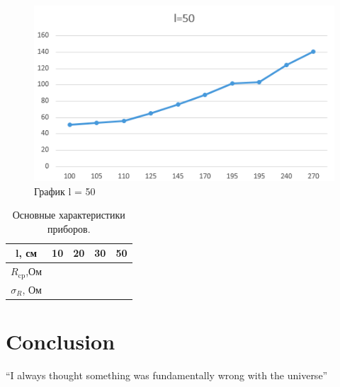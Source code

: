 \documentclass[14pt, a4paper]{scrartcl}
\begin{document}
\begin{figure}
\centering
\includegraphics[scale=1]{leq50.png}
\caption{График l = 50}
\label{fig:50len}
\end{figure}

\begin{table}[H]
\caption{\label{tab:charast}Основные характеристики приборов.}
\begin{center}
\begin{tabular}{|c|c|c|c|c|}
\hline
l, см& 10 & 20 & 30 & 50 \\
\hline
$R_\text{cp}$,Ом & &  & &\\
\hline
$\sigma_R$, Ом & & & &\\
\hline
\end{tabular}
\end{center}
\end{table} 

\section{Conclusion}
``I always thought something was fundamentally wrong with the universe'' \citep{adams1995hitchhiker}



\end{document}
